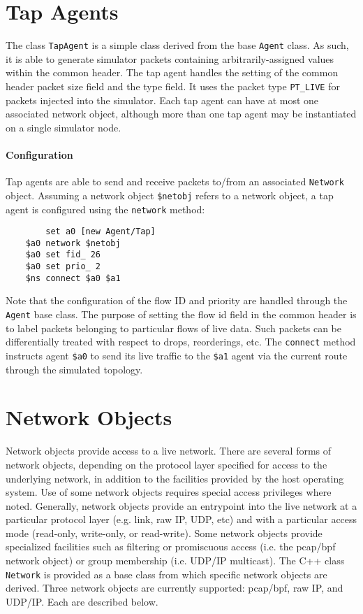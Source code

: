 \section{Tap Agents}

The class {\tt TapAgent} is a simple class derived from the base
{\tt Agent} class.
As such, it is able to generate simulator packets containing
arbitrarily-assigned values within the \ns common header.
The tap agent handles the setting of the common header packet
size field and the type field.  
It uses the packet type {\tt PT\_LIVE} for packets injected
into the simulator.
Each tap agent can have at most one associated network object, although
more than one tap agent may be instantiated on a single simulator node.

\paragraph{Configuration}
Tap agents are able to send and receive packets to/from an
associated {\tt Network} object.
Assuming a network object {\tt \$netobj} refers to a network
object, a tap agent is configured using the {\tt network} method:
\begin{verbatim}
        set a0 [new Agent/Tap]
	$a0 network $netobj
	$a0 set fid_ 26
	$a0 set prio_ 2
	$ns connect $a0 $a1
\end{verbatim}
Note that the configuration of the flow ID and priority are
handled through the {\tt Agent} base class.
The purpose of setting the flow id field in the common header
is to label packets belonging to particular flows of live data.
Such packets can be differentially treated with respect
to drops, reorderings, etc.
The {\tt connect} method instructs agent {\tt \$a0} to send
its live traffic to the {\tt \$a1} agent via the current
route through the simulated topology.

\section{Network Objects}

Network objects provide access to a live network.
There are several forms of network objects, depending on the
protocol layer specified for access to the underlying network,
in addition to the facilities provided by the host operating system.
Use of some network objects requires special access
privileges where noted.
Generally, network objects provide an entrypoint into the live
network at a particular protocol layer (e.g. link, raw IP, UDP, etc)
and with a particular access mode (read-only, write-only, or read-write).
Some network objects provide specialized facilities such as filtering
or promiscuous access (i.e. the pcap/bpf network object)
or group membership (i.e. UDP/IP multicast).
The C++ class {\tt Network} is provided as a base class from
which specific network objects are derived.
Three network objects are currently supported: pcap/bpf, raw IP,
and UDP/IP.
Each are described below.

